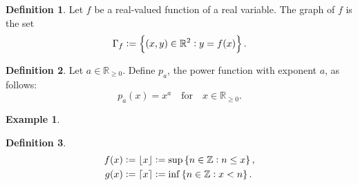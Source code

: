 \documentclass[12pt,openany]{book}
\DeclarePairedDelimiter{\ceil}{\lceil}{\rceil}
\DeclarePairedDelimiter{\floor}{\lfloor}{\rfloor}
\theoremstyle{definition}
\newtheorem{definition}{Definition}[chapter]
\newtheorem{example}{Example}[chapter]
\newcommand{\Z}{\mathbb{Z}}
\newcommand{\R}{\mathbb{R}}
\begin{document}
	\begin{tcolorbox}[colframe=defcolor,title={\color{white}\bf Graph}]
		\begin{definition}
			Let $f$ be a real-valued function of a real variable. The graph of $f$ is the set \[
			\Gamma_f:=\set{(x,y)\in\R^2:y=f(x)}.
			\]
		\end{definition}
	\end{tcolorbox}
	\vspace{8pt}
	\begin{tcolorbox}[colframe=defcolor,title={\color{white}\bf Power Function}]
		\begin{definition}
			Let $a\in\R_{\geq 0}$. Define $p_a$, the power function with exponent $a$, as follows: \[
			p_a(x)=x^a\quad\text{for}\quad x\in\R_{\geq 0}.
			\]
		\end{definition}
	\end{tcolorbox}
	\begin{example}
		\ \begin{center}
		\end{center}
	\end{example}
	\vspace{8pt}
	\begin{tcolorbox}[colframe=defcolor,title={\color{white}\bf The Floor and Ceiling Function}]
		\begin{definition}
			\begin{align*}
				f(x)&:=\floor*{x}:=\sup\set{n\in\Z:n\leq x},\\
				g(x)&:=\ceil*{x}:=\inf\set{n\in\Z:x<n}.
			\end{align*}
		\end{definition}
	\end{tcolorbox}
\end{document}
